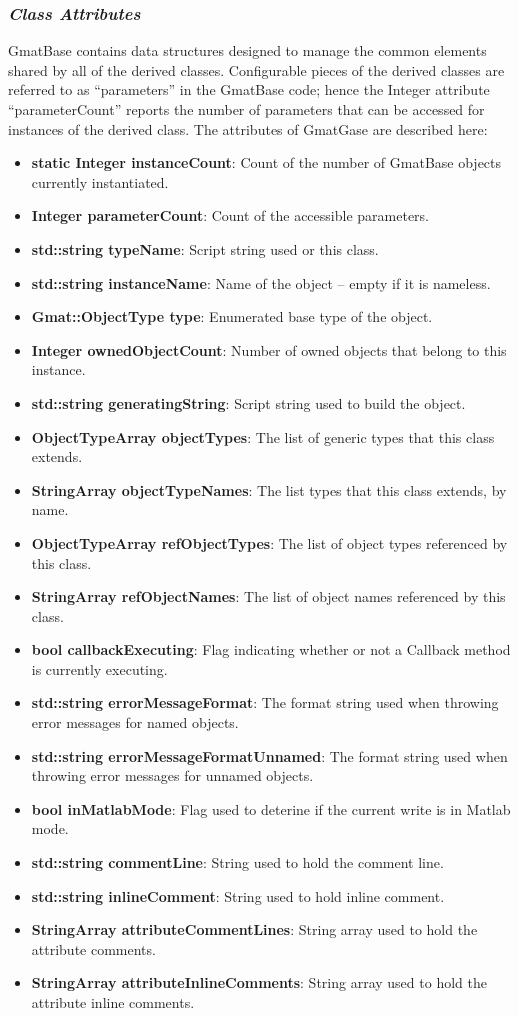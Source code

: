 \subsubsection{\textit{Class Attributes}}

GmatBase contains data structures designed to manage the common elements shared by all of the
derived classes.  Configurable pieces of the derived classes are referred to as ``parameters'' in
the GmatBase code; hence the Integer attribute ``parameterCount'' reports the number of parameters
that can be accessed for instances of the derived class.  The attributes of GmatGase are described
here:

\begin{itemize}
\item \textbf{static Integer instanceCount}: Count of the number of GmatBase objects currently
instantiated.
\item \textbf{Integer parameterCount}: Count of the accessible parameters.
\item \textbf{std::string typeName}: Script string used or this class.
\item \textbf{std::string instanceName}: Name of the object -- empty if it is nameless.
\item \textbf{Gmat::ObjectType type}: Enumerated base type of the object.
\item \textbf{Integer ownedObjectCount}: Number of owned objects that belong to this instance.
\item \textbf{std::string generatingString}: Script string used to build the object.
\item \textbf{ObjectTypeArray objectTypes}: The list of generic types that this class extends.
\item \textbf{StringArray objectTypeNames}: The list types that this class extends, by name.
\item \textbf{ObjectTypeArray refObjectTypes}: The list of object types referenced by this class.
\item \textbf{StringArray refObjectNames}: The list of object names referenced by this class.
\item \textbf{bool callbackExecuting}: Flag indicating whether or not a Callback method is currently
executing.
\item \textbf{std::string errorMessageFormat}: The format string used when throwing error messages
for named objects.
\item \textbf{std::string errorMessageFormatUnnamed}: The format string used when throwing error
messages for unnamed objects.
\item \textbf{bool inMatlabMode}: Flag used to deterine if the current write is in Matlab mode.
\item \textbf{std::string commentLine}: String used to hold the comment line.
\item \textbf{std::string inlineComment}: String used to hold inline comment.
\item \textbf{StringArray attributeCommentLines}: String array used to hold the attribute comments.
\item \textbf{StringArray attributeInlineComments}: String array used to hold the attribute inline
comments.
\end{itemize}

